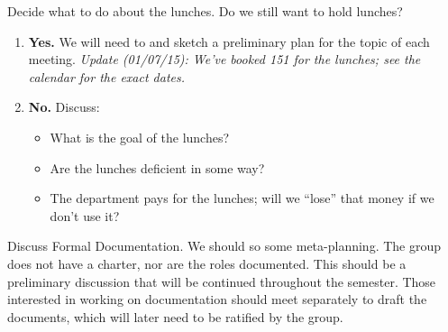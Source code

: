 \documentclass{agenda}
\begin{document}
\begin{agendaitem}{15}{Decide what to do about the lunches.}
    Do we still want to hold lunches?
    \begin{enumerate}
        \item {\bf Yes.} We will need to  and sketch a preliminary 
        plan for the topic of each meeting. \emph{Update (01/07/15): We've booked 151 for the lunches; see the calendar for the exact dates.}
        \item {\bf No.} Discuss:
            \begin{itemize}
                \item What is the goal of the lunches?
                \item Are the lunches deficient in some way?
                \item The department pays for the lunches; will we ``lose'' that money if we don't use it?
            \end{itemize}
    \end{enumerate}
\end{agendaitem}

\begin{agendaitem}{10}{Discuss Formal Documentation.}
    We should so some meta-planning. The group does not have a
    charter, nor are the roles documented. This should be a
    preliminary discussion that will be continued throughout the
    semester. Those interested in working on documentation should meet
    separately to draft the documents, which will later need to be
    ratified by the group.
\end{agendaitem}
\end{document}
